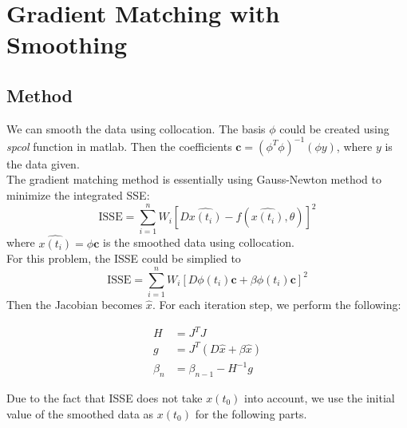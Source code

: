 \documentclass{article}
\begin{document}
\section{Gradient Matching with Smoothing}
\subsection{Method}
We can smooth the data using collocation. The basis $\phi$ could be created using \textit{spcol} function in matlab. Then the coefficients $\mathbf{c}=(\phi^{T}\phi)^{-1}(\phi y)$, where $y$ is the data given.\\

The gradient matching method is essentially using Gauss-Newton method to minimize the integrated SSE:
$$\text{ISSE}=\sum_{i=1}^n W_{i} [D\hat{x(t_i)}-f(\hat{x(t_i)},\theta)]^2$$
where $\hat{x(t_i)}=\phi \mathbf{c}$ is the smoothed data using collocation. \\
For this problem, the ISSE could be simplied to 
$$\text{ISSE}=\sum_{i=1}^n W_{i} [D\phi(t_i)\mathbf{c}+\beta \phi(t_i)\mathbf{c}]^2$$
Then the Jacobian becomes $\hat{x}$. For each iteration step, we perform the following:
\begin{center}
\begin{equation}
\begin{split}
H & = J^{T}J\\
g & = J^{T}(D\hat{x}+\beta\hat{x})\\
\beta_n & = \beta_{n-1} - H^{-1}g
\end{split}
\end{equation}
\end{center}
Due to the fact that ISSE does not take $x(t_0)$ into account, we use the initial value of the smoothed data as $x(t_0)$ for the following parts.
\end{document}
